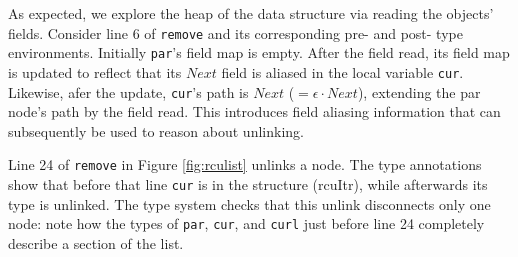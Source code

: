 As expected, we explore the heap of the data structure via reading the objects' fields. 
Consider line 6 of \lstinline|remove| and its corresponding pre- and post- type environments.  Initially \texttt{par}'s field map is empty.  After the field read, its field map is updated to reflect that its $Next$ field is aliased in the local variable \texttt{cur}.  Likewise, afer the update, \texttt{cur}'s path is $Next$ ($=\epsilon\cdot Next$), extending the par node's path by the field read.  This introduces field aliasing information that can subsequently be used to reason about unlinking.

Line 24 of \lstinline|remove| in Figure \ref{fig:rculist} unlinks a node.
The type annotations show that before that line \lstinline|cur| is in the structure (\textsf{rcuItr}), while afterwards its type is \textsf{unlinked}.
The type system checks that this unlink disconnects only one node: note how the types of \lstinline|par|, \lstinline|cur|, and \lstinline|curl| just before line 24 completely describe a section of the list.

